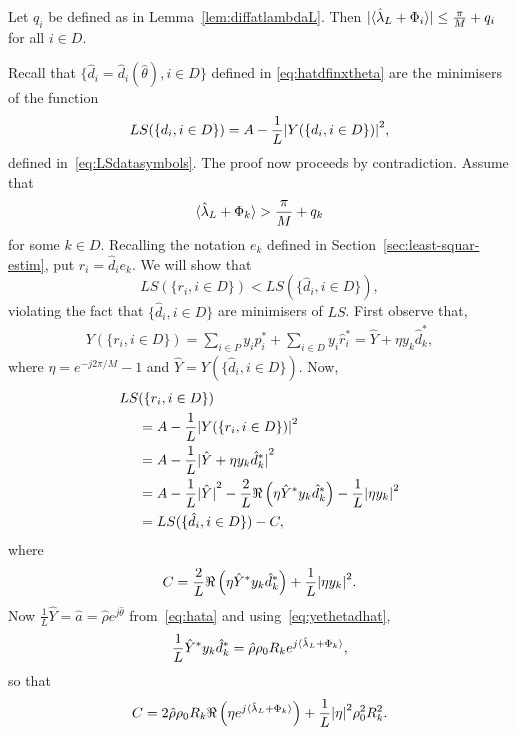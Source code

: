 \documentclass[journal]{IEEEtran}
\begin{document}
\begin{lemma}\label{lem:fracpartlambdahatnotpi} Let $q_i$ be defined as in Lemma~\ref{lem:diffatlambdaL}.  Then ${\vert \langle \hat{\lambda}_L + \Phi_i \rangle \vert} \leq \frac{\pi}{M} + q_i$ for all $i \in D$.
\end{lemma}
\begin{IEEEproof}
Recall that $\{\hat{d}_i = \hat{d}_i(\hat{\theta}), i \in D\}$ defined in \eqref{eq:hatdfinxtheta} are the minimisers of the function 
\[
LS(\{d_i, i \in D\}) = A - \frac{1}{L}{\vert Y(\{d_i, i \in D\}) \vert}^2,
\]
defined in~\eqref{eq:LSdatasymbols}. The proof now proceeds by contradiction.  Assume that 
\begin{equation}\label{eq:fraclambassumption}
\langle \hat{\lambda}_L + \Phi_k \rangle > \frac{\pi}{M} + q_k
\end{equation}
for some $k \in D$.  Recalling the notation $e_k$ defined in Section~\ref{sec:least-squar-estim}, put $r_i = \hat{d}_i e_k$.  We will show that 
\[
LS(\{r_i, i \in D\}) < LS(\{\hat{d}_i, i \in D\}),
\]
violating the fact that $\{\hat{d}_i, i \in D\}$ are minimisers of $LS$.  First observe that,
\begin{align*}
Y(\{ r_i, i \in D\}) = \sum_{i \in P} y_ip_i^* + \sum_{i \in D} y_i\hat{r}_i^* = \hat{Y} + \eta y_k\hat{d}_k^*,
\end{align*}
where $\eta = e^{-j2\pi/M} - 1$ and $\hat{Y} = Y(\{ \hat{d}_i, i \in D\})$.  Now,
\begin{align*}
LS&(\{r_i, i \in D\}) \\
&= A - \frac{1}{L} {\vert  Y(\{ r_i, i \in D\})  \vert}^2 \\
&= A - \frac{1}{L} {\vert  \hat{Y} + \eta y_k\hat{d}_k^*  \vert}^2 \\
&= A - \frac{1}{L}{\vert \hat{Y} \vert}^2 - \frac{2}{L}\Re\left(\eta \hat{Y}^* y_k \hat{d}_k^* \right) -  \frac{1}{L}{\vert  \eta y_k \vert}^2\\
&= LS(\{\hat{d}_i, i \in D\}) - C,
\end{align*}
where 
\[
C = \frac{2}{L}\Re\left(\eta \hat{Y}^* y_k \hat{d}_k^* \right) +  \frac{1}{L}{\vert  \eta y_k  \vert}^2.
\]
Now $\frac{1}{L}\hat{Y} = \hat{a} = \hat{\rho} e^{j\hat{\theta}}$ from~\eqref{eq:hata} and using~\eqref{eq:yethetadhat},
\[
\frac{1}{L} \hat{Y}^* y_k \hat{d}_k^* = \hat{\rho} \rho_0 R_k e^{j\langle \hat{\lambda}_L + \Phi_k \rangle},
\]
so that
\begin{equation}\label{eq:Ddefn}
C = 2 \hat{\rho} \rho_0 R_k \Re\left( \eta e^{j\langle \hat{\lambda}_L + \Phi_k \rangle}\right) + \frac{1}{L}{\vert \eta \vert}^2\rho_0^2 R_k^2.
\end{equation}

\end{IEEEproof}
\end{document}
